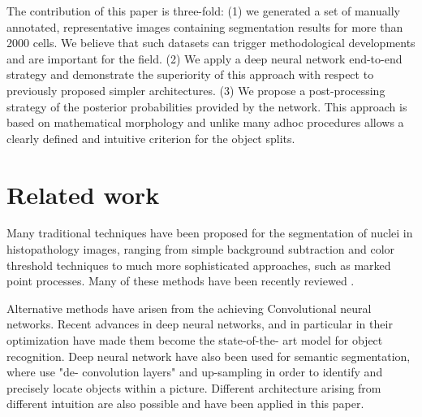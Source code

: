 \documentclass{article}
\begin{document}
The contribution of this paper is three-fold: (1) we generated a
set of manually annotated, representative images containing segmentation results for
more than 2000 cells. We believe that such datasets
can trigger methodological developments and are
important for the field. (2) We apply a deep neural network end-to-end strategy and
demonstrate the superiority of this approach with respect to
previously proposed simpler architectures. (3) We propose a
post-processing strategy of the posterior probabilities provided by
the network. This approach is based on mathematical
morphology and unlike many adhoc procedures allows a clearly defined
and intuitive criterion for the object splits.

\section{Related work}
\label{sec:related}

\noindent Many traditional techniques have been proposed for the segmentation of
nuclei in histopathology images, ranging from simple background
subtraction and color threshold techniques 
to much more
sophisticated approaches, such as marked point
processes\cite{Kulikova2012}. Many of these methods have been recently
reviewed \cite{irshad2014methods}.    


Alternative methods 
have arisen from the achieving Convolutional neural networks.
Recent advances in deep neural networks, and in 
particular in their optimization have made them become the state-of-the-
art model for object recognition.  Deep neural network have also been 
used for 
semantic segmentation, where \cite{long2015fcn} use "de-
convolution layers" and up-sampling in order to identify and precisely 
locate objects within a picture. Different architecture arising from 
different intuition are also possible and have been applied in this paper.
\end{document}
